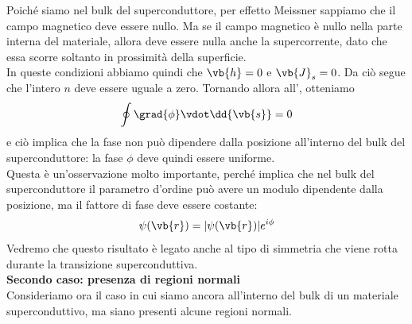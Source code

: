 \begin{figure}[H]
   \centering
\end{figure}
\hspace{-0.6cm}Poiché siamo nel bulk del superconduttore, per effetto Meissner sappiamo che il campo magnetico deve essere nullo. Ma se il campo magnetico è nullo nella parte interna del materiale, allora deve essere nulla anche la supercorrente, dato che essa scorre soltanto in prossimità della superficie.\\
In queste condizioni abbiamo quindi che $\vb{h}=0$ e $\vb{J}_s=0$. Da ciò segue che l'intero $n$ deve essere uguale a zero. Tornando allora all', otteniamo
\begin{equation*}
   \oint \grad{\phi} \vdot \dd{\vb{s}}=0
\end{equation*}
e ciò implica che la fase non può dipendere dalla posizione all'interno del bulk del superconduttore: la fase $\phi$ deve quindi essere uniforme.\\
Questa è un'osservazione molto importante, perché implica che nel bulk del superconduttore il parametro d'ordine può avere un modulo dipendente dalla posizione, ma il fattore di fase deve essere costante:
\begin{equation*}
      \psi(\vb{r})
      =
      |\psi(\vb{r})|e^{i\phi}
\end{equation*}
Vedremo che questo risultato è legato anche al tipo di simmetria che viene rotta durante la transizione superconduttiva.\\[0.2cm]
\textbf{Secondo caso: presenza di regioni normali}\\
Consideriamo ora il caso in cui siamo ancora all'interno del bulk di un materiale superconduttivo, ma siano presenti alcune regioni normali.\\
